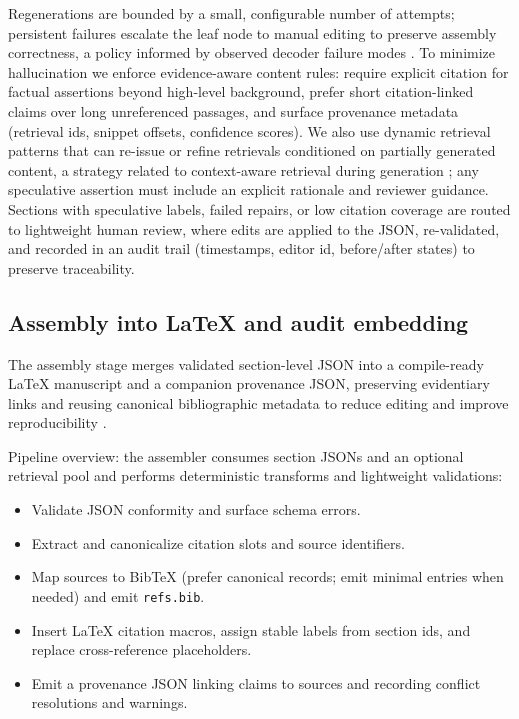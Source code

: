 \documentclass{article}%
\begin{document}
Regenerations are bounded by a small, configurable number of attempts; persistent failures escalate the leaf node to manual editing to preserve assembly correctness, a policy informed by observed decoder failure modes \cite{web_wu_2025_constrained_auto_regressive_decoding_constrains_}.
To minimize hallucination we enforce evidence-aware content rules: require explicit citation for factual assertions beyond high-level background, prefer short citation-linked claims over long unreferenced passages, and surface provenance metadata (retrieval ids, snippet offsets, confidence scores).
We also use dynamic retrieval patterns that can re-issue or refine retrievals conditioned on partially generated content, a strategy related to context-aware retrieval during generation \cite{web_qi_2025_ar_rag_autoregressive_retrieval_augmentation_for}; any speculative assertion must include an explicit rationale and reviewer guidance.
Sections with speculative labels, failed repairs, or low citation coverage are routed to lightweight human review, where edits are applied to the JSON, re-validated, and recorded in an audit trail (timestamps, editor id, before/after states) to preserve traceability.%

%
\subsection{Assembly into LaTeX and audit embedding}%


%
The assembly stage merges validated section-level JSON into a compile-ready LaTeX manuscript and a companion provenance JSON, preserving evidentiary links and reusing canonical bibliographic metadata to reduce editing and improve reproducibility \cite{web_bos_2023_latex_metadata_and_publishing_workflows}.

Pipeline overview: the assembler consumes section JSONs and an optional retrieval pool and performs deterministic transforms and lightweight validations:
\begin{itemize}
  \item Validate JSON conformity and surface schema errors.
  \item Extract and canonicalize citation slots and source identifiers.
  \item Map sources to BibTeX (prefer canonical records; emit minimal entries when needed) and emit \texttt{refs.bib}.
  \item Insert LaTeX citation macros, assign stable labels from section ids, and replace cross-reference placeholders.
  \item Emit a provenance JSON linking claims to sources and recording conflict resolutions and warnings.
\end{itemize}
\end{document}
